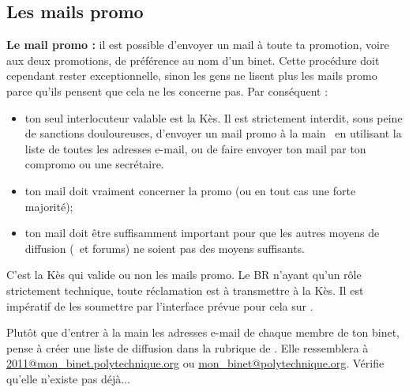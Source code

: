 \subsection{Les mails promo}


\textbf{Le mail promo :} il est possible d'envoyer un mail \`a toute
ta promotion, voire aux deux promotions, de pr\'ef\'erence au nom d'un binet.
Cette proc\'edure doit cependant rester exceptionnelle, sinon les gens ne lisent plus les
mails promo parce qu'ils pensent que cela ne les concerne pas. Par
cons\'equent :
\begin{itemize}
  \item ton seul interlocuteur valable est la K\`es. Il est strictement interdit, sous peine de sanctions douloureuses, d'envoyer un mail promo \og \`a la main \fg~en utilisant la liste de toutes les adresses e-mail,
  ou de faire envoyer ton mail par ton compromo ou une secr\'etaire.
  \item ton mail doit vraiment concerner la promo (ou en tout cas une forte majorit\'e);
  \item ton mail doit \^etre suffisamment important pour que les autres moyens de diffusion (\fkz\ et forums) ne soient pas des moyens suffisants.
\end{itemize}
C'est la K\`es qui valide ou non les mails promo. Le BR n'ayant qu'un r\^ole strictement technique, toute r\'eclamation est \`a transmettre \`a la K\`es. Il est
imp\'eratif de les soumettre par l'interface pr\'evue pour cela sur \fkz.

Plut\^ot que d'entrer \`a la main les adresses e-mail de chaque membre de ton binet, pense \`a cr\'eer une liste de diffusion dans la rubrique  de .
Elle ressemblera \`a \url{2011@mon_binet.polytechnique.org} ou \url{mon_binet@polytechnique.org}. V\'erifie qu'elle n'existe pas d\'ej\`a...